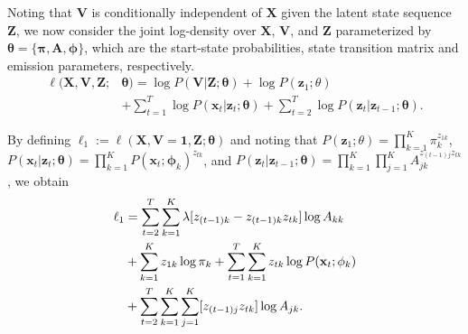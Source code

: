 Noting that $\mathbf{V}$ is conditionally independent of $\mathbf{X}$ given the
latent state sequence $\mathbf{Z}$, we now consider the joint log-density over
$\mathbf{X}$, $\mathbf{V}$, and $\mathbf{Z}$ parameterized by
$\mathbf{\theta} = \{\mathbf{\pi},\mathbf{A}, \mathbf{\phi}\}$, which are the start-state
probabilities, state transition matrix and emission parameters, respectively. 
\begin{align*}
    \ell(\mathbf{X}, \mathbf{V}, \mathbf{Z} ; &\mathbf{\theta}) 
    = \log P(\mathbf{V}|\mathbf{Z}; \mathbf{\theta}) + \log P(\mathbf{z}_{1}; \theta) \\
    &+ \sum_{t=1}^{T}\log P(\mathbf{x}_t|\mathbf{z}_t; \mathbf{\theta})
     + \sum_{t=2}^{T}\log P(\mathbf{z}_t|\mathbf{z}_{t-1};\mathbf{\theta}).
\end{align*}

By defining $\ell_1 := \ell(\mathbf{X}, \mathbf{V}=\mathbf{1}, \mathbf{Z} ;
\mathbf{\theta})$ and noting that
$P(\mathbf{z}_{1}; \theta) = \prod_{k=1}^{K}\pi_{k}^{z_{1k}}$,
$P(\mathbf{x}_t|\mathbf{z}_t; \mathbf{\theta}) = \prod_{k=1}^{K}P(\mathbf{x}_t ;
\mathbf{\phi}_k)^{z_{tk}}$, and $P(\mathbf{z}_t|\mathbf{z}_{t-1};
\mathbf{\theta}) = \prod_{k=1}^{K}\prod_{j=1}^{K}A_{jk}^{z_{(t-1)j}z_{tk}}$,
we obtain
\begin{align*}
    \ell_1
    &= \sum^{T}_{t=2}\sum^{K}_{k=1}\lambda[z_{(t-1)k} - z_{(t-1)k}z_{tk}]\log A_{kk} \notag\\
    &+ \sum_{k=1}^{K}{z_{1k}}\log \pi_{k} + \sum_{t=1}^{T}\sum_{k=1}^{K} z_{tk}\log P(\mathbf{x}_t ; \mathbf{\phi}_k) \notag\\
    &+ \sum_{t=2}^{T}\sum_{k=1}^{K}\sum_{j=1}^{K}[z_{(t-1)j}z_{tk}]\log A_{jk}.
\end{align*}

